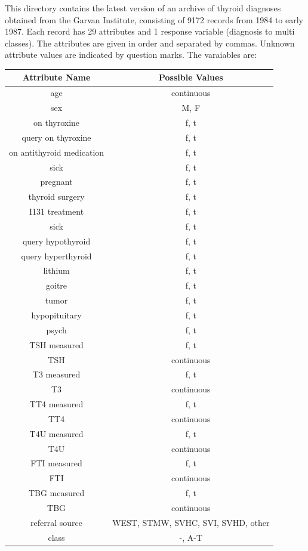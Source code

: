 \documentclass{article}
\begin{document}
This directory contains the latest version of an archive of thyroid diagnoses
obtained from the Garvan Institute, consisting of 9172 records from 1984 to
early 1987.  Each record has 29 attributes and 1 response variable (diagnosis to multi classes). The attributes are given in order and separated by commas.  Unknown attribute values are indicated by question marks.  The varaiables are:
\begin{center}
\begin{tabular}{c | c }
\textbf{Attribute Name} & \textbf{Possible Values}  \\ \hline
age & continuous \\
sex & M, F \\
on thyroxine & f, t \\
query on thyroxine & f, t \\
on antithyroid medication & f, t \\
sick & f, t \\
pregnant & f, t \\
thyroid surgery & f, t \\
I131 treatment & f, t \\sick & f, t \\
query hypothyroid & f, t \\
query hyperthyroid & f, t \\
lithium & f, t \\
goitre & f, t \\
tumor & f, t \\
hypopituitary & f, t \\
psych & f, t \\
TSH measured & f, t \\
TSH & continuous \\
T3 measured & f, t \\
T3 & continuous \\
TT4 measured & f, t \\
TT4 & continuous \\
T4U measured & f, t \\
T4U & continuous \\
FTI measured & f, t \\
FTI & continuous \\
TBG measured & f, t \\
TBG & continuous \\
referral source & WEST, STMW, SVHC, SVI, SVHD, other\\
class & -, A-T
\end{tabular}
\label{table:cvalue1}
\end{center}
\end{document}
